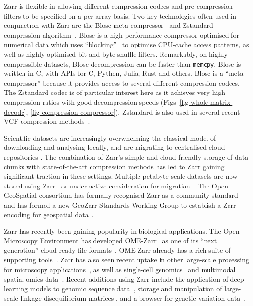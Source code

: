 \documentclass[a4paper,num-refs]{oup-contemporary}
\begin{document}
Zarr is flexible in allowing different compression codecs and 
pre-compression filters to be specified on a per-array basis.
Two key technologies often used in conjunction with Zarr are the Blosc
meta-compressor~\cite{alted2010modern}
and Zstandard compression algorithm~\citep{collet2021rfc}.
Blosc is a high-performance compressor optimised for numerical
data which uses ``blocking''~\citep{alted2010modern} to 
optimise CPU-cache access patterns, as well as highly optimised
bit and byte shuffle filters.  Remarkably, on highly 
compressible datasets, Blosc decompression can be faster 
than \texttt{memcpy}.
Blosc is written in C, with APIs for C, Python, Julia, Rust
and others.
Blosc is a ``meta-compressor'' because it provides 
access to several different compression codecs. The 
Zstandard codec is of particular 
interest here as it achieves very high compression ratios
with good decompression speeds (Figs~\ref{fig-whole-matrix-decode},
\ref{fig-compression-compressor}).
Zstandard is also used in several recent VCF compression 
methods~\citep[e.g.][]{lefaive2021sparse,wertenbroek2022xsi}.

Scientific datasets are increasingly overwhelming the classical
model of downloading and analysing locally, and are migrating to 
centralised cloud repositories \citep{abernathey2021cloud,moore2021ome}.
The combination of Zarr's simple and cloud-friendly storage 
of data chunks with state-of-the-art compression methods has 
led to Zarr gaining significant traction in these settings.
Multiple petabyte-scale datasets are now stored using 
Zarr~\cite[e.g.][]{gowan2022using, %
fahnestock2023mappin, %
cmip6_dataset}
or under active consideration for migration~\citep{durbin2020task,abernathey2021opening}.
The Open GeoSpatial consortium has formally recognised Zarr as a community
standard~\cite{ogc_zarr2_standard}
and has formed
a new GeoZarr Standards Working Group to establish a Zarr encoding for
geospatial data~\cite{ogc_geozarr_news}.

Zarr has recently been gaining popularity in biological applications.
The Open Microscopy Environment has developed OME-Zarr~\cite{moore2023ome} as one 
of its ``next generation'' cloud ready file formats~\citep{moore2021ome}.
OME-Zarr already has a rich suite of supporting
tools~\cite{moore2023ome,rzepka2023toward}. 
Zarr has also seen recent uptake in other large-scale processing for
microscopy applications~\citep{ruan2024image}, as well as 
single-cell genomics~\citep{dhapola2022scarf,virshup2023scverse}
and multimodal spatial omics
data~\citep{marconato2024spatialdata,baker2023emobject}.
Recent additions using Zarr include the application of deep learning
models to genomic sequence data~\citep{klie2023predictive}, storage and 
manipulation of large-scale linkage disequilibrium matrices \cite{zabad2023fast},  
and a browser for genetic variation data~\citep{konig2023divbrowse}.
\end{document}

